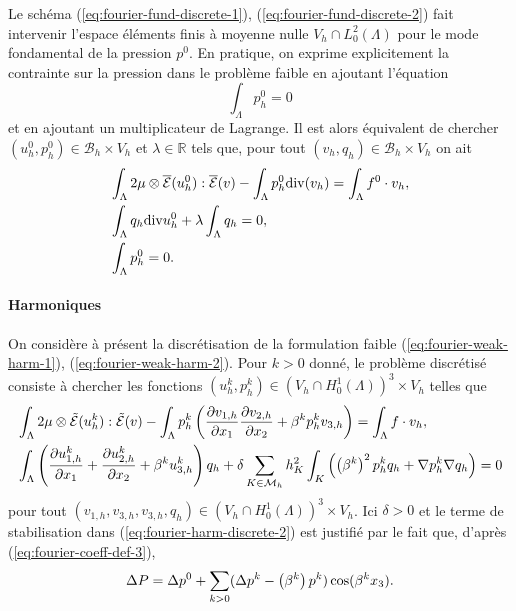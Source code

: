 Le schéma (\ref{eq:fourier-fund-discrete-1}),
(\ref{eq:fourier-fund-discrete-2}) fait intervenir l'espace
éléments finis à moyenne nulle $V_h \cap L^2_0(\Lambda)$ pour le mode
fondamental de la pression $p^0$. En pratique, on exprime
explicitement la contrainte sur la pression dans le problème faible
en ajoutant l'équation
\begin{equation}
\int_\Lambda p^0_h = 0
\end{equation}
et en ajoutant un multiplicateur de Lagrange. Il est alors équivalent
de chercher $(u^0_h, p^0_h)\in \mathcal B_h\times V_h$ et
$\lambda\in\mathbb R$ tels que, pour tout $(v_h, q_h)\in \mathcal
B_h\times V_h$ on ait
\begin{align}
  &\int_\Lambda
  2\mu\otimes\overline{\mathcal E}(u^0_h):\overline{\mathcal E}(v)
  -\int_\Lambda p^0_h\mathrm{div}(v_h) = \int_\Lambda f^0\cdot v_h, \label{eq:fourier-fund-discrete-1-prat}\\
  & \int_\Lambda q_h\mathrm{div} u^0_h + \lambda \int_\Lambda q_h =
  0,\label{eq:fourier-fund-discrete-2-prat}\\
  & \int_\Lambda p_h^0 = 0.\label{eq:fourier-fund-discrete-3-prat}
\end{align}

\paragraph{Harmoniques}
On considère à présent la discrétisation de la formulation
faible (\ref{eq:fourier-weak-harm-1}),
(\ref{eq:fourier-weak-harm-2}). Pour $k > 0$ donné, le problème
discrétisé consiste à chercher les fonctions $(u^k_h, p^k_h) \in
(V_h\cap H_0^1(\Lambda))^3\times V_h$ telles que
\begin{align}
  &\int_\Lambda 2\mu\otimes
  \tilde{\mathcal E}(u^k_h):\tilde{\mathcal E}(v) - \int_\Lambda
  p_h^k\left( \frac{\partial v_{1,h}}{\partial x_1}
    \frac{\partial v_{2,h}}{\partial x_2} +\beta^k p^k_h v_{3,h} \right) =
  \int_\Lambda f\cdot v_h,\label{eq:fourier-harm-discrete-1}\\
  &\int_\Lambda \left( \frac{\partial u^k_{1,h}}{\partial x_1} +
    \frac{\partial u^k_{2,h}}{\partial x_2} + \beta^k u^k_{3,h} \right)q_h +
  \delta \sum_{K\in\mathcal M_h} h_K^2
  \int_K\left( \left( \beta^k \right)^2 p^k_h q_h + \nabla p_h^k \nabla
    q_h \right) = 0\label{eq:fourier-harm-discrete-2}
\end{align}
pour tout $(v_{1,h}, v_{3,h}, v_{3,h}, q_h) \in (V_h\cap
H_0^1(\Lambda))^3\times V_h$. Ici $\delta > 0$ et le terme de
stabilisation dans (\ref{eq:fourier-harm-discrete-2}) est justifié
par le fait que, d'après (\ref{eq:fourier-coeff-def-3}),
\begin{equation}
  \Delta P = \Delta p^0 + \sum_{k > 0} (\Delta p^k -
  \left( \beta^k \right)p^k)\cos(\beta^k x_3).
\end{equation}



